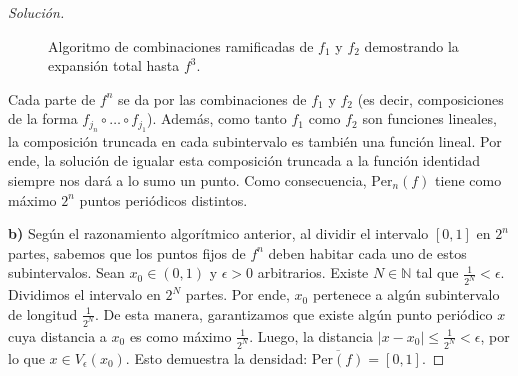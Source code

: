 \begin{proof}[Solución]
\begin{figure}[htbp]
{
		}
		\caption{Algoritmo de combinaciones ramificadas de $f_1$ y $f_2$ demostrando la expansión total hasta $f^3$.}
		\label{fig:algoritmo_f}
	\end{figure}
	
	Cada parte de $f^n$ se da por las combinaciones de $f_1$ y $f_2$ (es decir, composiciones de la forma $f_{j_n} \circ \dots \circ f_{j_1}$). Además, como tanto $f_1$ como $f_2$ son funciones lineales, la composición truncada en cada subintervalo es también una función lineal. Por ende, la solución de igualar esta composición truncada a la función identidad siempre nos dará a lo sumo un punto. Como consecuencia, $\text{Per}_n(f)$ tiene como máximo $2^n$ puntos periódicos distintos.
	
	\textbf{b)} Según el razonamiento algorítmico anterior, al dividir el intervalo $[0,1]$ en $2^n$ partes, sabemos que los puntos fijos de $f^n$ deben habitar cada uno de estos subintervalos. 
	Sean $x_0 \in (0,1)$ y $\epsilon > 0$ arbitrarios. Existe $N \in \mathbb{N}$ tal que $\frac{1}{2^N} < \epsilon$. Dividimos el intervalo en $2^N$ partes. Por ende, $x_0$ pertenece a algún subintervalo de longitud $\frac{1}{2^N}$. De esta manera, garantizamos que existe algún punto periódico $x$ cuya distancia a $x_0$ es como máximo $\frac{1}{2^N}$. 
	Luego, la distancia $|x - x_0| \le \frac{1}{2^N} < \epsilon$, por lo que $x \in V_\epsilon(x_0)$. Esto demuestra la densidad: $\overline{\text{Per}(f)} = [0,1]$.
	

\end{proof}

